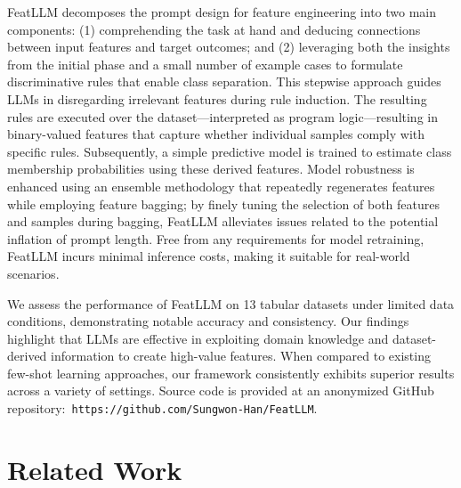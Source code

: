 \textsf{FeatLLM} decomposes the prompt design for feature engineering into two main components: (1) comprehending the task at hand and deducing connections between input features and target outcomes; and (2) leveraging both the insights from the initial phase and a small number of example cases to formulate discriminative rules that enable class separation. This stepwise approach guides LLMs in disregarding irrelevant features during rule induction. The resulting rules are executed over the dataset—interpreted as program logic—resulting in binary-valued features that capture whether individual samples comply with specific rules. Subsequently, a simple predictive model is trained to estimate class membership probabilities using these derived features. Model robustness is enhanced using an ensemble methodology that repeatedly regenerates features while employing feature bagging; by finely tuning the selection of both features and samples during bagging, \textsf{FeatLLM} alleviates issues related to the potential inflation of prompt length. Free from any requirements for model retraining, \textsf{FeatLLM} incurs minimal inference costs, making it suitable for real-world scenarios.

We assess the performance of \textsf{FeatLLM} on 13 tabular datasets under limited data conditions, demonstrating notable accuracy and consistency. Our findings highlight that LLMs are effective in exploiting domain knowledge and dataset-derived information to create high-value features. When compared to existing few-shot learning approaches, our framework consistently exhibits superior results across a variety of settings. Source code is provided at an anonymized GitHub repository:~\texttt{https://github.com/Sungwon-Han/FeatLLM}.

\section{Related Work}


